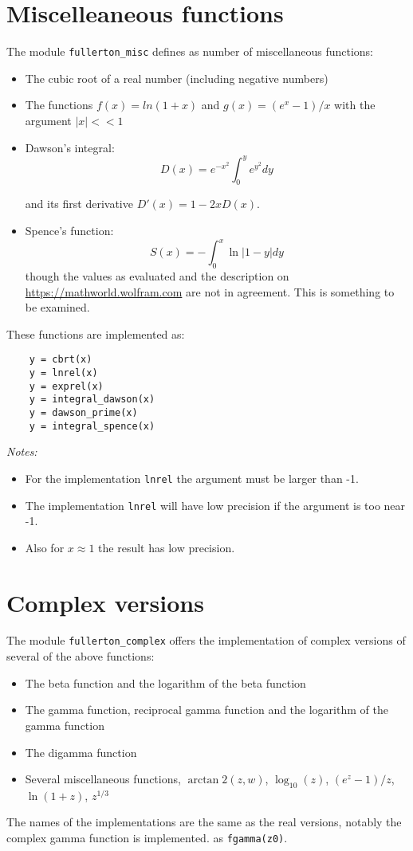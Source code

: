 \documentclass{article}
\begin{document}
\section{Miscelleaneous functions}
The module \verb+fullerton_misc+ defines as number of miscellaneous functions:

\begin{itemize}
\item
The cubic root of a real number (including negative numbers)
\item
The functions $f(x) = ln(1+x)$ and $g(x) = (e^x-1)/x$ with the argument $|x| << 1$
\item
Dawson's integral:
\begin{equation}
     D(x) = e^{-x^2} \int^y_0 e^{y^2} dy
\end{equation}

\noindent and its first derivative $D'(x) = 1 - 2 x D(x)$.
\item
Spence's function:
\begin{equation}
     S(x) = - \int^x_0 \ln |1-y| dy
\end{equation}
\noindent though the values as evaluated and the description on \url{https://mathworld.wolfram.com} are
not in agreement. This is something to be examined.
\end{itemize}

These functions are implemented as:
\begin{verbatim}
    y = cbrt(x)
    y = lnrel(x)
    y = exprel(x)
    y = integral_dawson(x)
    y = dawson_prime(x)
    y = integral_spence(x)
\end{verbatim}

\emph{Notes:}
\begin{itemize}
\item
For the implementation \verb+lnrel+ the argument must be larger than -1.
\item
The implementation \verb+lnrel+ will have low precision if the argument is too near -1.
\item
Also for $x \approx 1$ the result has low precision.
\end{itemize}


\section{Complex versions}
The module \verb+fullerton_complex+ offers the implementation of complex versions of several of the above functions:
\begin{itemize}
\item The beta function and the logarithm of the beta function
\item The gamma function, reciprocal gamma function and the logarithm of the gamma function
\item The digamma function
\item Several miscellaneous functions, $\arctan2(z,w)$, $\log_{10}(z)$, $(e^{z}-1)/z$, $\ln(1+z)$, $z^{1/3}$
\end{itemize}

The names of the implementations are the same as the real versions, notably the complex gamma function is implemented.
as \verb+fgamma(z0)+.
\end{document}
